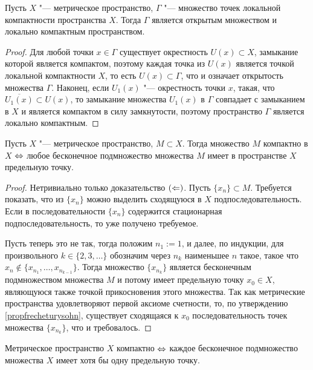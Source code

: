 \begin{theorem}
    Пусть $X$ "--- метрическое пространство, $\Gamma$ "--- множество точек локальной компактности пространства $X$. Тогда $\Gamma$ является открытым множеством и локально компактным пространством.
\end{theorem}

\begin{proof}
    Для любой точки $x \in \Gamma$ существует окрестность $U(x) \subset X$, замыкание которой является компактом, поэтому каждая точка из $U(x)$ является точкой локальной компактности $X$, то есть $U(x) \subset \Gamma$, что и означает открытость множества $\Gamma$. Наконец, если $U_1(x)$ "--- окрестность точки $x$, такая, что $\overline{U_1(x)} \subset U(x)$, то замыкание множества $U_1(x)$ в $\Gamma$ совпадает с замыканием в $X$ и является компактом в силу замкнутости, поэтому пространство $\Gamma$ является локально компактным.
\end{proof}

\begin{theorem}
    Пусть $X$ "--- метрическое пространство, $M\subset X$. Тогда множество $M$ компактно в $X$ $\Leftrightarrow$ любое бесконечное подмножество множества $M$ имеет в пространстве $X$ предельную точку.
\end{theorem}

\begin{proof}
    Нетривиально только доказательство $(\Leftarrow)$. Пусть $\{x_n\} \subset M$. Требуется показать, что из $\{x_n\}$ можно выделить сходящуюся в $X$ подпоследовательность. Если в последовательности $\{x_n\}$ содержится стационарная подпоследовательность, то уже получено требуемое.
    
    Пусть теперь это не так, тогда положим $n_1 := 1$, и далее, по индукции, для произвольного $k \in \{2, 3, \dotsc\}$ обозначим через $n_k$ наименьшее $n$ такое, такое что $x_n \not\in \{x_{n_1}, \dotsc, x_{n_{k-1}}\}$. Тогда множество $\{x_{n_k}\}$ является бесконечным подмножеством множества $M$ и потому имеет предельную точку $x_0 \in X$, являющуюся также точкой прикосновения этого множества. Так как метрические пространства удовлетворяют первой аксиоме счетности, то, по утверждению \ref{propfrecheturysohn}, существует сходящаяся к $x_0$ последовательность точек множества $\{x_{n_k}\}$, что и требовалось.
\end{proof}

\begin{corollary}
    Метрическое пространство $X$ компактно $\Leftrightarrow$ каждое бесконечное подмножество множества $X$ имеет хотя бы одну предельную точку.
\end{corollary}

